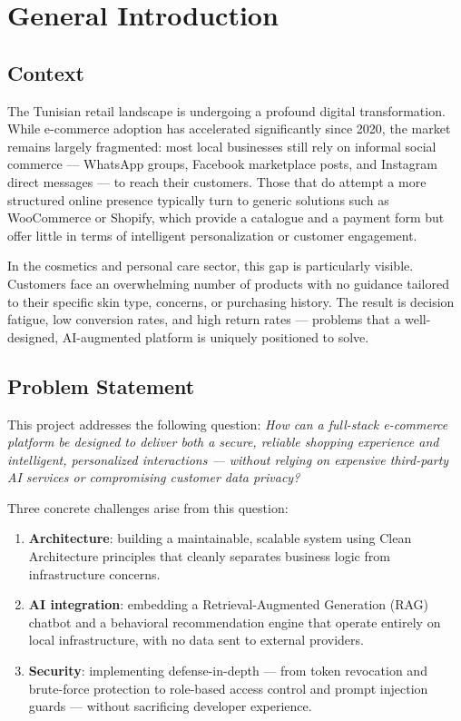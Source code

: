 \chapter*{General Introduction}

\section*{Context}

The Tunisian retail landscape is undergoing a profound digital transformation.
While e-commerce adoption has accelerated significantly since 2020, the market
remains largely fragmented: most local businesses still rely on informal social
commerce --- WhatsApp groups, Facebook marketplace posts, and Instagram direct
messages --- to reach their customers.
Those that do attempt a more structured online presence typically turn to
generic solutions such as WooCommerce or Shopify, which provide a catalogue
and a payment form but offer little in terms of intelligent personalization
or customer engagement.

In the cosmetics and personal care sector, this gap is particularly visible.
Customers face an overwhelming number of products with no guidance tailored
to their specific skin type, concerns, or purchasing history.
The result is decision fatigue, low conversion rates, and high return rates ---
problems that a well-designed, AI-augmented platform is uniquely positioned
to solve.

\section*{Problem Statement}

This project addresses the following question:
\textit{How can a full-stack e-commerce platform be designed to deliver both
a secure, reliable shopping experience and intelligent, personalized
interactions --- without relying on expensive third-party AI services or
compromising customer data privacy?}

Three concrete challenges arise from this question:
\begin{enumerate}
  \item \textbf{Architecture}: building a maintainable, scalable system using
        Clean Architecture principles that cleanly separates business logic
        from infrastructure concerns.
  \item \textbf{AI integration}: embedding a Retrieval-Augmented Generation
        (RAG) chatbot and a behavioral recommendation engine that operate
        entirely on local infrastructure, with no data sent to external providers.
  \item \textbf{Security}: implementing defense-in-depth --- from token revocation
        and brute-force protection to role-based access control and prompt
        injection guards --- without sacrificing developer experience.
\end{enumerate}

